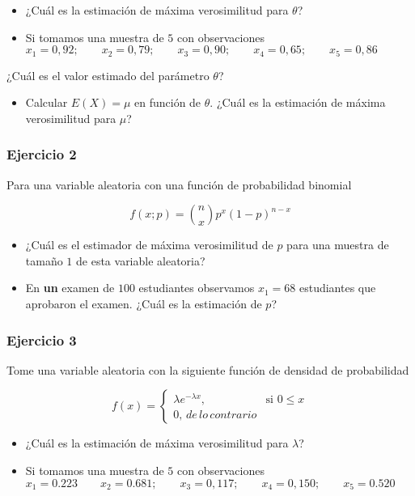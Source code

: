 \documentclass[
]{book}
\providecommand{\tightlist}{%
  \setlength{\itemsep}{0pt}\setlength{\parskip}{0pt}}
\begin{document}
\begin{itemize}
\item
  ¿Cuál es la estimación de máxima verosimilitud para \(\theta\)?
\item
  Si tomamos una muestra de \(5\) con observaciones
  \(x_1 = 0,92; \qquad x_2 = 0,79; \qquad x_3 = 0,90; \qquad x_4 = 0,65; \qquad x_5 = 0,86\)
\end{itemize}

¿Cuál es el valor estimado del parámetro \(\theta\)?

\begin{itemize}
\tightlist
\item
  Calcular \(E(X)=\mu\) en función de \(\theta\). ¿Cuál es la estimación de máxima verosimilitud para \(\mu\)?
\end{itemize}

\hypertarget{ejercicio-2-7}{%
\subsubsection{Ejercicio 2}\label{ejercicio-2-7}}

Para una variable aleatoria con una función de probabilidad binomial

\[f(x; p)=\binom n x p^x(1-p)^{n-x}\]

\begin{itemize}
\item
  ¿Cuál es el estimador de máxima verosimilitud de \(p\) para una muestra de tamaño \(1\) de esta variable aleatoria?
\item
  En \textbf{un} examen de \(100\) estudiantes observamos \(x_1=68\) estudiantes que aprobaron el examen. ¿Cuál es la estimación de \(p\)?
\end{itemize}

\hypertarget{ejercicio-3-4}{%
\subsubsection{Ejercicio 3}\label{ejercicio-3-4}}

Tome una variable aleatoria con la siguiente función de densidad de probabilidad

\[
    f(x)=
\begin{cases}
    \lambda e^{-\lambda x},& \text{si } 0 \leq x\\
    0, \, de\, lo\, contrario
\end{cases}
\]

\begin{itemize}
\item
  ¿Cuál es la estimación de máxima verosimilitud para \(\lambda\)?
\item
  Si tomamos una muestra de \(5\) con observaciones
  \(x_1 = 0.223 \qquad x_2 = 0.681; \qquad x_3 = 0,117; \qquad x_4 = 0,150; \qquad x_5 = 0.520\)
\end{itemize}
\end{document}
